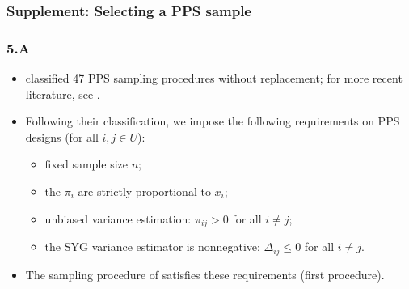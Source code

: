 \documentclass{my_eth_beamer}
\numberwithin{equation}{section}
\newcommand{\NR}{5}
\begin{document}
\subsubsection{Supplement: Selecting a PPS sample}
\begin{frame}
    \frametitle{\NR.\insertsubsectionnumber A~\insertsubsubsection}
    \begin{itemize}
    \setlength{\itemsep}{8pt}
    \item \citet{hanif_brewer_1980} classified \alert{47} PPS sampling
        procedures without replacement; for more recent literature, see
        \citet{tille_2006}.
        \item Following their classification, we impose the following
            \alert{requirements} on PPS designs (for all $i,j\in U$):
            \vspace{0.25em}
            \begin{itemize}
            \setlength{\itemsep}{6pt}
                \item \alert{fixed} sample size $n$;
                \item the $\pi_i$ are strictly \alert{proportional} to $x_i$;
                \item \alert{unbiased} variance estimation: $\pi_{ij}>0$
                    for all $i\neq j$;
                \item the SYG variance estimator is \alert{nonnegative}:
                    $\Delta_{ij} \leq 0$ for all $i\neq j$.
            \end{itemize}
    \item The sampling procedure of \citet{brewer_1963,brewer_1975} satisfies
        these requirements (first procedure).
    \end{itemize}
\end{frame}
\end{document}
